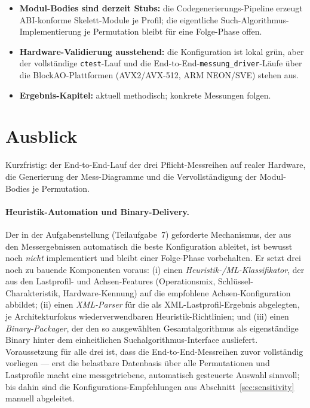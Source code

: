 \begin{itemize}
  \item \textbf{Modul-Bodies sind derzeit Stubs:} die Codegenerierungs-Pipeline erzeugt ABI-konforme
  Skelett-Module je Profil; die eigentliche Such-Algorithmus-Implementierung je Permutation bleibt
  für eine Folge-Phase offen.
  \item \textbf{Hardware-Validierung ausstehend:} die Konfiguration ist lokal grün, aber der
  vollständige \texttt{ctest}-Lauf und die End-to-End-\texttt{messung\_driver}-Läufe über die
  BlockAO-Plattformen (AVX2/AVX-512, ARM NEON/SVE) stehen aus.
  \item \textbf{Ergebnis-Kapitel:} aktuell methodisch; konkrete Messungen folgen.
\end{itemize}

\section{Ausblick}\label{sec:outlook}

Kurzfristig: der End-to-End-Lauf der drei Pflicht-Messreihen auf realer Hardware, die Generierung
der Mess-Diagramme und die Vervollständigung der Modul-Bodies je Permutation.

\paragraph{Heuristik-Automation und Binary-Delivery.} Der in der Aufgabenstellung (Teilaufgabe~7)
geforderte Mechanismus, der aus den Messergebnissen automatisch die beste Konfiguration ableitet,
ist bewusst noch \emph{nicht} implementiert und bleibt einer Folge-Phase vorbehalten. Er setzt drei
noch zu bauende Komponenten voraus: (i) einen \emph{Heuristik-/ML-Klassifikator}, der aus den
Lastprofil- und Achsen-Features (Operationsmix, Schlüssel-Charakteristik, Hardware-Kennung) auf die
empfohlene Achsen-Konfiguration abbildet; (ii) einen \emph{XML-Parser} für die als
XML-Lastprofil-Ergebnis abgelegten, je Architekturfokus wiederverwendbaren Heuristik-Richtlinien;
und (iii) einen \emph{Binary-Packager}, der den so ausgewählten Gesamtalgorithmus als eigenständige
Binary hinter dem einheitlichen Suchalgorithmus-Interface ausliefert. Voraussetzung für alle drei
ist, dass die End-to-End-Messreihen zuvor vollständig vorliegen --- erst die belastbare Datenbasis
über alle Permutationen und Lastprofile macht eine messgetriebene, automatisch gesteuerte Auswahl
sinnvoll; bis dahin sind die Konfigurations-Empfehlungen aus Abschnitt~\ref{sec:sensitivity} manuell
abgeleitet.

